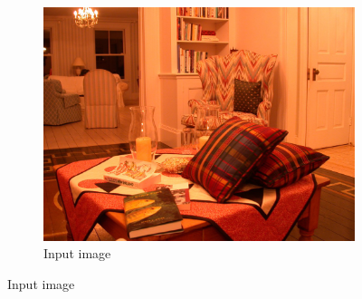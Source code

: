 \documentclass[a4paper]{article}
\begin{document}
\begin{figure}[H]
	\begin{subfigure}[h]{0.24\textwidth}
		\centering
		\includegraphics[width=\textwidth]{interior}
		\caption*{Input image}
	\end{subfigure}
	

\end{figure}
\end{document}
